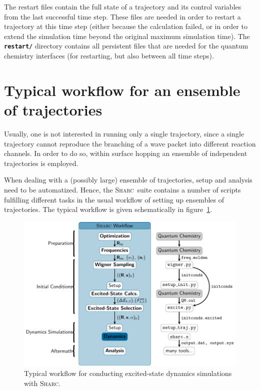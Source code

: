 \documentclass[a4paper,10pt,DIV=15,openany]{scrbook}
\newcommand{\sharc}{\textsc{Sharc}}
\newcommand{\ttt}[1]{\textbf{\texttt{#1}}}
\begin{document}
The restart files contain the full state of a trajectory and its control variables from the last successful time step. These files are needed in order to restart a trajectory at this time step (either because the calculation failed, or in order to extend the simulation time beyond the original maximum simulation time). 
The \ttt{restart/} directory contains all persistent files that are needed for the quantum chemistry interfaces (for restarting, but also between all time steps).




\section{Typical workflow for an ensemble of trajectories}
\label{sec:typical_workflow}

Usually, one is not interested in running only a single trajectory, since a single trajectory cannot reproduce the branching of a wave packet into different reaction channels. In order to do so, within surface hopping an ensemble of independent trajectories is employed. 

When dealing with a (possibly large) ensemble of trajectories, setup and analysis need to be automatized. Hence, the \sharc\ suite contains a number of scripts fulfilling different tasks in the usual workflow of setting up ensembles of trajectories.
The typical workflow is given schematically in figure~\ref{fig:workflow}.

\begin{figure}[htb]
  \centering
  \includegraphics[scale=1]{img/workflow/prepare.pdf}
  \caption{Typical workflow for conducting excited-state dynamics simulations with \sharc.}
  \label{fig:workflow}
\end{figure}
\end{document}

